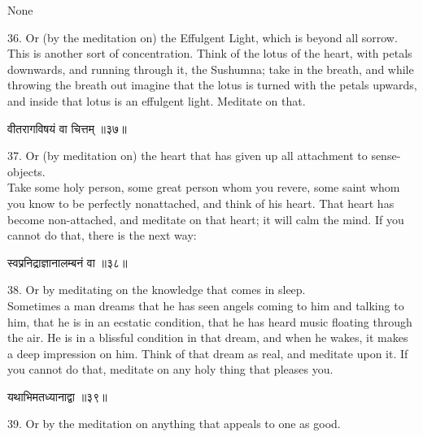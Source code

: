 \begin{center}
\begin{sanskrit}
None
\end{sanskrit}
\end{center}
36. Or (by the meditation on) the Effulgent Light, which is
beyond all sorrow. \\

This is another sort of concentration. Think of the lotus of
the heart, with petals downwards, and running through it, the Sushumna;
take in the breath, and while throwing the breath out imagine that the
lotus is turned with the petals upwards, and inside that lotus is an
effulgent light. Meditate on that. \\

\begin{center}
\begin{sanskrit}
वीतरागविषयं वा चित्तम् ॥३७॥
\end{sanskrit}
\end{center}
37. Or (by meditation on) the heart that has given up all
attachment to sense-objects. \\

Take some holy person, some great person whom you revere, some
saint whom you know to be perfectly nonattached, and think of his
heart. That heart has become non-attached, and meditate on that heart;
it will calm the mind. If you cannot do that, there is the next way:\\

\begin{center}
\begin{sanskrit}
स्वप्ननिद्राज्ञानालम्बनं वा ॥३८॥
\end{sanskrit}
\end{center}
38. Or by meditating on the knowledge that comes in sleep. \\

Sometimes a man dreams that he has seen angels coming to him
and talking to him, that he is in an ecstatic condition, that he has
heard music floating through the air. He is in a blissful condition in
that dream, and when he wakes, it makes a deep impression on him. Think
of that dream as real, and meditate upon it. If you cannot do that,
meditate on any holy thing that pleases you. \\

\begin{center}
\begin{sanskrit}
यथाभिमतध्यानाद्वा ॥३९॥
\end{sanskrit}
\end{center}
39. Or by the meditation on anything that appeals to one as
good. \\

